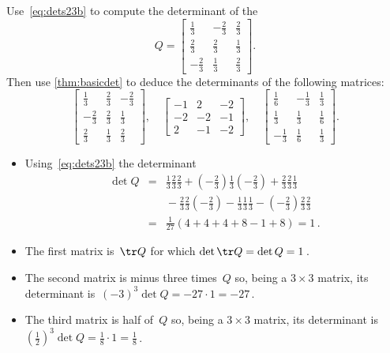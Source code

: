 \begin{example} 
Use~\eqref{eq:dets23b} to compute the determinant of the 
\begin{equation*}
Q=\begin{bmatrix} \frac13&-\frac23&\frac23
\\\frac23&\frac23&\frac13
\\-\frac23&\frac13&\frac23 \end{bmatrix}.
\end{equation*}
Then use \cref{thm:basicdet} to deduce the determinants of the following matrices:
\begin{equation*}
\begin{bmatrix} \frac13&\frac23&-\frac23
\\-\frac23&\frac23&\frac13
\\\frac23&\frac13&\frac23 \end{bmatrix}
,\quad
\begin{bmatrix} -1&2&-2
\\-2&-2&-1
\\2&-1&-2 \end{bmatrix}
,\quad
\begin{bmatrix} \frac16&-\frac13&\frac13
\\\frac13&\frac13&\frac16
\\-\frac13&\frac16&\frac13 \end{bmatrix}.
\end{equation*}

\begin{solution} 
\begin{itemize}
\item Using~\eqref{eq:dets23b} the determinant
\begin{eqnarray*}
\det Q&=&\tfrac13\tfrac23\tfrac23+(-\tfrac23)\tfrac13(-\tfrac23)
+\tfrac23\tfrac23\tfrac13
\\&&{}-\tfrac23\tfrac23(-\tfrac23)
-\tfrac13\tfrac13\tfrac13-(-\tfrac23)\tfrac23\tfrac23
\\&=&\tfrac1{27}(4+4+4+8-1+8)=1\,.
\end{eqnarray*}

\item The first matrix is~\(\tr Q\) for which \(\det\tr Q=\det Q=1\)\,.

\item The second matrix is minus three times~\(Q\) so, being a \(3\times3\) matrix, its determinant is~\((-3)^3\det Q=-27\cdot1=-27\)\,.

\item The third matrix is half of~\(Q\) so, being a \(3\times3\) matrix, its determinant is~\((\tfrac12)^3\det Q=\frac18\cdot1=\frac18\)\,.
\end{itemize}
\end{solution}
\end{example}



